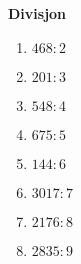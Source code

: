 \documentclass[english,hidelinks,pdftex, 11 pt, class=report,crop=false]{standalone}
\begin{document}
\begin{multicols}{3}
\textbf{Divisjon} 
\begin{enumerate}[label=\alph*)]
	\item  $ 468:2$	
	\item  $ 201:3$	
	\item  $ 548:4$	
	\item  $ 675:5$	
	\item  $ 144:6$	
	\item  $ 3017:7$	
	\item  $ 2176:8$	
	\item  $ 2835:9$	
\end{enumerate}

\end{multicols}
\end{document}
